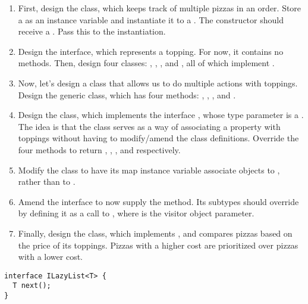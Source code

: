 \begin{enumerate}[label=(\alph*)]
  \item First, design the  class, which keeps track of multiple pizzas in an order. Store a  as an instance variable and instantiate it to a . The  constructor should receive a . Pass this to the  instantiation.
  \item Design the  interface, which represents a topping. For now, it contains no methods. Then, design four classes: , , , and , all of which implement .
  \item Now, let's design a class that allows us to do multiple actions with toppings. Design the generic  class, which has four methods: , , , and .
  \item Design the  class, which implements the interface , whose type parameter is a . The idea is that the  class serves as a way of associating a property with toppings without having to modify/amend the class definitions. Override the four methods to return , , , and  respectively.
  \item Modify the  class to have its map instance variable associate  objects to , rather than  to .
  \item Amend the  interface to now supply the  method. Its subtypes should override  by defining it as a call to , where  is the visitor object parameter.
  \item Finally, design the  class, which implements , and compares pizzas based on the price of its toppings. Pizzas with a higher cost are prioritized over pizzas with a lower cost.
\end{enumerate}

\begin{lstlisting}[language=MyJava]
interface ILazyList<T> {
  T next();
}
\end{lstlisting}

